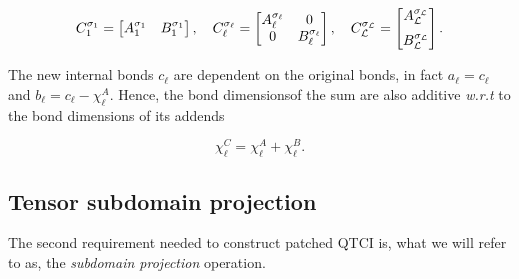 \begin{equation}
	C_1^{\sigma_1} =
	\begin{bmatrix}
	  A_1^{\sigma_1} & B_1^{\sigma_1} \\
	\end{bmatrix},\quad C_\ell^{\sigma_\ell} =
	\begin{bmatrix}
	  A_\ell^{\sigma_\ell} & 0 \\
	  0 & B_\ell^{\sigma_\ell}
	\end{bmatrix},\quad C_{\mathcal{L}}^{\sigma_{\mathcal{L}}} = \begin{bmatrix}
		A_{\mathcal{L}}^{\sigma_{\mathcal{L}}} \\[6pt]
		B_{\mathcal{L}}^{\sigma_{\mathcal{L}}} 
	  \end{bmatrix}.
	\label{eq:siteTenosorsTTSum}  
\end{equation}

The new internal bonds $c_\ell$ are dependent on the original bonds, in fact $a_\ell = c_\ell$ and $b_\ell = c_\ell - \chi^A_\ell$. Hence, the bond dimensions\footnotemark \;of the sum are also additive \textit{w.r.t} to the bond dimensions of its addends

\begin{equation}
	\chi^C_\ell = \chi^A_\ell + \chi^B_\ell.
\end{equation}


\subsection{Tensor subdomain projection}
The second requirement needed to construct patched QTCI is, what we will refer to as, the \textit{subdomain projection} operation. 

